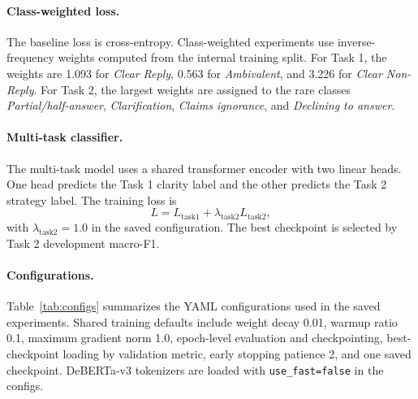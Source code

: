 \documentclass[11pt,twocolumn]{article}
\newcommand{\taskone}{Task 1}
\newcommand{\tasktwo}{Task 2}
\newcommand{\macroF}{macro-F1}
\begin{document}
\paragraph{Class-weighted loss.}
The baseline loss is cross-entropy. Class-weighted experiments use inverse-frequency weights computed from the internal training split. For \taskone{}, the weights are 1.093 for \textit{Clear Reply}, 0.563 for \textit{Ambivalent}, and 3.226 for \textit{Clear Non-Reply}. For \tasktwo{}, the largest weights are assigned to the rare classes \textit{Partial/half-answer}, \textit{Clarification}, \textit{Claims ignorance}, and \textit{Declining to answer}.

\paragraph{Multi-task classifier.}
The multi-task model uses a shared transformer encoder with two linear heads. One head predicts the \taskone{} clarity label and the other predicts the \tasktwo{} strategy label. The training loss is
\[
L = L_{\mathrm{task1}} + \lambda_{\mathrm{task2}} L_{\mathrm{task2}},
\]
with \(\lambda_{\mathrm{task2}}=1.0\) in the saved configuration. The best checkpoint is selected by \tasktwo{} development \macroF{}.

\paragraph{Configurations.}
Table~\ref{tab:configs} summarizes the YAML configurations used in the saved experiments. Shared training defaults include weight decay 0.01, warmup ratio 0.1, maximum gradient norm 1.0, epoch-level evaluation and checkpointing, best-checkpoint loading by validation metric, early stopping patience 2, and one saved checkpoint. DeBERTa-v3 tokenizers are loaded with \texttt{use\_fast=false} in the configs.
\end{document}
